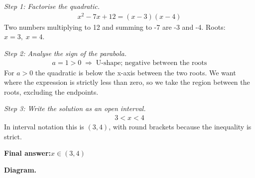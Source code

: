 \documentclass[11pt]{article}
\begin{document}
\textit{Step 1: Factorise the quadratic.}
\[\begin{gathered}
x^2 - 7x + 12 = (x - 3)(x - 4)
\end{gathered}\]
Two numbers multiplying to 12 and summing to -7 are -3 and -4. Roots: \( x = 3, \; x = 4 \).

\textit{Step 2: Analyse the sign of the parabola.}
\[\begin{gathered}
a = 1 > 0 \;\Longrightarrow\; \text{U-shape; negative between the roots}
\end{gathered}\]
For \( a > 0 \) the quadratic is below the x-axis between the two roots. We want where the expression is strictly less than zero, so we take the region between the roots, excluding the endpoints.

\textit{Step 3: Write the solution as an open interval.}
\[\begin{gathered}
3 < x < 4
\end{gathered}\]
In interval notation this is \( (3, 4) \), with round brackets because the inequality is strict.

\begin{answerbox}
\textbf{Final answer:}\quad \(\displaystyle x \in (3, 4)\)
\end{answerbox}
\textbf{Diagram.}
\end{document}

